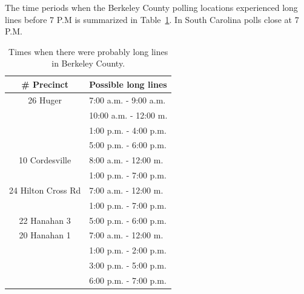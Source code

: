 The time periods when the Berkeley County polling locations experienced long lines before 7 P.M is summarized in Table~\ref{tab:line}.  In South Carolina polls close at 7 P.M.

\begin{table}
    \begin{center}
    \begin{tabular}{| c | p{3cm} |}
    \hline                   
    \# Precinct & Possible long lines\\
    \hline
    26 Huger&7:00 a.m. - 9:00 a.m.\\
            &10:00 a.m. - 12:00 m.\\
            &1:00 p.m. - 4:00 p.m.\\
            &5:00 p.m. - 6:00 p.m.\\
    \hline
    10 Cordesville &8:00 a.m. - 12:00 m.\\
                   &1:00 p.m. - 7:00 p.m.\\
    \hline  
    24 Hilton Cross Rd &7:00 a.m. - 12:00 m.\\
                       &1:00 p.m. - 7:00 p.m.\\
    \hline
    22 Hanahan 3 &5:00 p.m. - 6:00 p.m.\\
    \hline
    20 Hanahan 1 &7:00 a.m. - 12:00 m.\\
                 &1:00 p.m. - 2:00 p.m.\\
                 &3:00 p.m. - 5:00 p.m.\\
                 &6:00 p.m. - 7:00 p.m.\\
    \hline
    \end{tabular}
    \end{center}
    \caption{Times when there were probably long lines in Berkeley County.}
    \label{tab:line}
\end{table}




